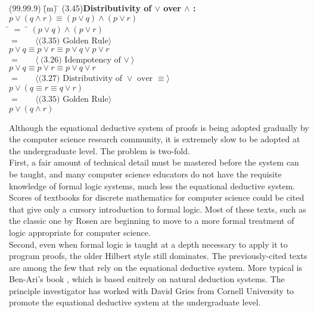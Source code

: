 \documentclass[fleqn, leqno]{article}
\newcommand{\lgap}{2pt}                             %
\newcommand{\mymathindent}{24pt}                      %
\newcommand{\Gll} {\langle}                         %
\newcommand{\Ggg} {\rangle}                         %
\newcommand{\Hint}[1]     {\ \ \ $\Gll              \mbox{#1} \Ggg$ }   %
\begin{document}
\begin{tabbing}
(99.99.9)$\;$\=(m)$\;$\=\kill
(3.45)\>\textbf{Distributivity of $\lor$ over $\land$ :}\quad $p\lor (q\land r)\equiv (p\lor q)\land (p\lor r)$\\[\lgap]
\hspace{\mymathindent} \= $= \;$ \=  \kill
  \> \>   $(p\lor q)\land (p\lor r)$\\[\lgap]
  \> $=$  \>  \Hint{(3.35) Golden Rule} \\[\lgap]
  \> \>   $p\lor q\equiv p\lor r\equiv p\lor q\lor p\lor r$\\[\lgap]
  \> $=$  \>  \Hint{(3.26) Idempotency of $\lor$} \\[\lgap]
  \> \>   $p\lor q\equiv p\lor r\equiv p\lor q\lor r$\\[\lgap]
  \> $=$  \>  \Hint{(3.27) Distributivity of $\lor$ over $\equiv$} \\[\lgap]
  \> \>   $p\lor (q\equiv r\equiv q\lor r)$\\[\lgap]
  \> $=$  \>  \Hint{(3.35) Golden Rule} \\[\lgap]
  \> \>   $p\lor (q\land r)$\\[\lgap]
\end{tabbing}


Although the equational deductive system of proofs is being adopted gradually by the computer science research community,
it is extremely slow to be adopted at the undergraduate level. The problem is two-fold.\\

First, a fair amount of technical
detail must be mastered before the system can be taught, and many computer science educators do not have the requisite
knowledge of formal logic systems, much less the equational deductive system.
Scores of textbooks for discrete mathematics for computer science could be cited that give only a cursory introduction to
formal logic. Most of these texts, such as the classic one by Rosen \cite{Rosen} are beginning to move to a more
formal treatment of logic appropriate for computer science.\\

Second, even when formal logic is taught at a depth necessary to apply it to program proofs, the older Hilbert style
still dominates.
The previously-cited texts \cite{Cohen, LADM, Kald} are among the few that rely on the equational deductive system. 
More typical is Ben-Ari's book \cite{Ben}, which is based enitrely on natural deduction systems.
The principle investigator \cite{Warf} has worked with David Gries \cite{Gries} from Cornell University to promote
the equational deductive system at the undergraduate level.\\
\end{document}
